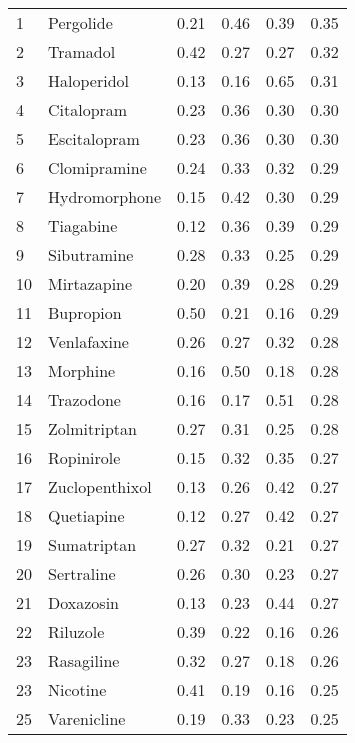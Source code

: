 \documentclass[preprint,12pt]{elsarticle}
\begin{document}
\begin{table}[h]
\begin{tabular}{llllll}
  1 & Pergolide & 0.21 & 0.46 & 0.39 & 0.35 \\ 
  2 & Tramadol & 0.42 & 0.27 & 0.27 & 0.32 \\ 
  3 & Haloperidol & 0.13 & 0.16 & 0.65 & 0.31 \\ 
  4 & Citalopram & 0.23 & 0.36 & 0.30 & 0.30 \\ 
  5 & Escitalopram & 0.23 & 0.36 & 0.30 & 0.30 \\ 
  6 & Clomipramine & 0.24 & 0.33 & 0.32 & 0.29 \\ 
  7 & Hydromorphone & 0.15 & 0.42 & 0.30 & 0.29 \\ 
  8 & Tiagabine & 0.12 & 0.36 & 0.39 & 0.29 \\ 
  9 & Sibutramine & 0.28 & 0.33 & 0.25 & 0.29 \\ 
  10 & Mirtazapine & 0.20 & 0.39 & 0.28 & 0.29 \\ 
  11 & Bupropion & 0.50 & 0.21 & 0.16 & 0.29 \\ 
  12 & Venlafaxine & 0.26 & 0.27 & 0.32 & 0.28 \\ 
  13 & Morphine & 0.16 & 0.50 & 0.18 & 0.28 \\ 
  14 & Trazodone & 0.16 & 0.17 & 0.51 & 0.28 \\ 
  15 & Zolmitriptan & 0.27 & 0.31 & 0.25 & 0.28 \\ 
  16 & Ropinirole & 0.15 & 0.32 & 0.35 & 0.27 \\ 
  17 & Zuclopenthixol & 0.13 & 0.26 & 0.42 & 0.27 \\ 
  18 & Quetiapine & 0.12 & 0.27 & 0.42 & 0.27 \\ 
  19 & Sumatriptan & 0.27 & 0.32 & 0.21 & 0.27 \\ 
  20 & Sertraline & 0.26 & 0.30 & 0.23 & 0.27 \\ 
  21 & Doxazosin & 0.13 & 0.23 & 0.44 & 0.27 \\ 
  22 & Riluzole & 0.39 & 0.22 & 0.16 & 0.26 \\ 
  23 & Rasagiline & 0.32 & 0.27 & 0.18 & 0.26 \\ 
  23 & Nicotine & 0.41 & 0.19 & 0.16 & 0.25 \\ 
  25 & Varenicline & 0.19 & 0.33 & 0.23 & 0.25 \\ 
   \hline
\end{tabular}
\end{table}
\end{document}
